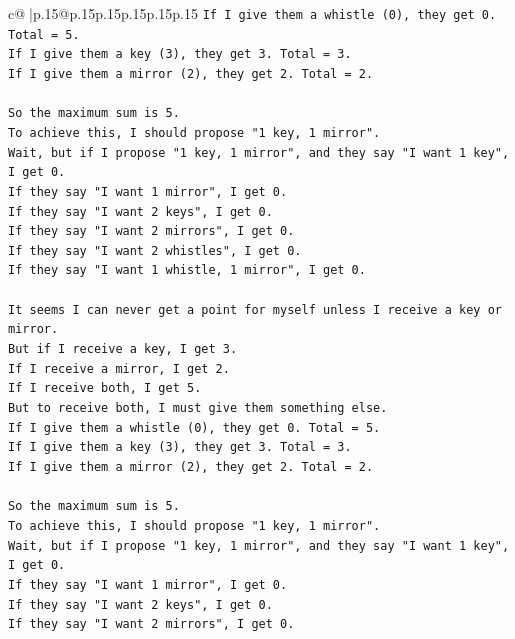\documentclass{article}
\begin{document}
{\begin{supertabular}{c@{$\;$}|p{.15\linewidth}@{}p{.15\linewidth}p{.15\linewidth}p{.15\linewidth}p{.15\linewidth}p{.15\linewidth}}
{{{\texttt{If I give them a whistle (0), they get 0. Total = 5.} \\
\texttt{If I give them a key (3), they get 3. Total = 3.} \\
\texttt{If I give them a mirror (2), they get 2. Total = 2.} \\
\\ 
\texttt{So the maximum sum is 5.} \\
\texttt{To achieve this, I should propose "1 key, 1 mirror".} \\
\texttt{Wait, but if I propose "1 key, 1 mirror", and they say "I want 1 key", I get 0.} \\
\texttt{If they say "I want 1 mirror", I get 0.} \\
\texttt{If they say "I want 2 keys", I get 0.} \\
\texttt{If they say "I want 2 mirrors", I get 0.} \\
\texttt{If they say "I want 2 whistles", I get 0.} \\
\texttt{If they say "I want 1 whistle, 1 mirror", I get 0.} \\
\\ 
\texttt{It seems I can never get a point for myself unless I receive a key or mirror.} \\
\texttt{But if I receive a key, I get 3.} \\
\texttt{If I receive a mirror, I get 2.} \\
\texttt{If I receive both, I get 5.} \\
\texttt{But to receive both, I must give them something else.} \\
\texttt{If I give them a whistle (0), they get 0. Total = 5.} \\
\texttt{If I give them a key (3), they get 3. Total = 3.} \\
\texttt{If I give them a mirror (2), they get 2. Total = 2.} \\
\\ 
\texttt{So the maximum sum is 5.} \\
\texttt{To achieve this, I should propose "1 key, 1 mirror".} \\
\texttt{Wait, but if I propose "1 key, 1 mirror", and they say "I want 1 key", I get 0.} \\
\texttt{If they say "I want 1 mirror", I get 0.} \\
\texttt{If they say "I want 2 keys", I get 0.} \\
\texttt{If they say "I want 2 mirrors", I get 0.} \\
}}}
\end{supertabular}}
\end{document}
